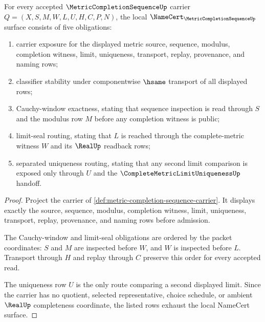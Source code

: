 \begin{theorem}
\label{thm:metric-completion-sequence-namecert-obligations}
For every accepted $\MetricCompletionSequenceUp$ carrier $Q=(X,S,M,W,L,U,H,C,P,N)$, the local $\NameCert_{\MetricCompletionSequenceUp}$ surface consists of five obligations:
\begin{enumerate}
\item carrier exposure for the displayed metric source, sequence, modulus, completion witness, limit, uniqueness, transport, replay, provenance, and naming rows;
\item classifier stability under componentwise $\hsame$ transport of all displayed rows;
\item Cauchy-window exactness, stating that sequence inspection is read through $S$ and the modulus row $M$ before any completion witness is public;
\item limit-seal routing, stating that $L$ is reached through the complete-metric witness $W$ and its $\RealUp$ readback rows;
\item separated uniqueness routing, stating that any second limit comparison is exposed only through $U$ and the $\CompleteMetricLimitUniquenessUp$ handoff.
\end{enumerate}
\end{theorem}
\begin{proof}
Project the carrier of \autoref{def:metric-completion-sequence-carrier}. It displays exactly the source, sequence, modulus, completion witness, limit, uniqueness, transport, replay, provenance, and naming rows before admission.

The Cauchy-window and limit-seal obligations are ordered by the packet coordinates: $S$ and $M$ are inspected before $W$, and $W$ is inspected before $L$. Transport through $H$ and replay through $C$ preserve this order for every accepted read.

The uniqueness row $U$ is the only route comparing a second displayed limit. Since the carrier has no quotient, selected representative, choice schedule, or ambient $\RealUp$ completeness coordinate, the listed rows exhaust the local NameCert surface.
\end{proof}

